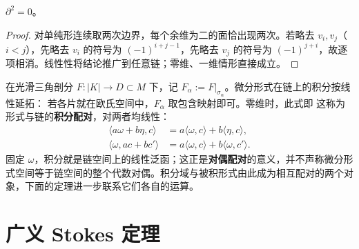 \begin{theorem}\label{thm:chain-boundary-square}
    $\partial^2=0$。
\end{theorem}
\begin{proof}
    对单纯形连续取两次边界，每个余维为二的面恰出现两次。若略去 $v_i,v_j$（$i<j$），先略去 $v_i$ 的符号为 $(-1)^{i+j-1}$，先略去 $v_j$ 的符号为 $(-1)^{j+i}$，故逐项相消。线性性将结论推广到任意链；零维、一维情形直接成立。
\end{proof}

在光滑三角剖分 $F:|K|\to D\subset M$ 下，记 $F_\alpha:=F|_{\sigma_\alpha}$。微分形式在链上的积分按线性延拓：
若各片就在欧氏空间中，$F_\alpha$ 取包含映射即可。零维时，此式即
这称为形式与链的\textbf{积分配对}，对两者均线性：
\begin{align*}
    \langle a\omega+b\eta,c\rangle&=a\langle\omega,c\rangle+b\langle\eta,c\rangle,\\
    \langle\omega,ac+bc'\rangle&=a\langle\omega,c\rangle+b\langle\omega,c'\rangle.
\end{align*}
固定 $\omega$，积分就是链空间上的线性泛函；这正是\textbf{对偶配对}的意义，并不声称微分形式空间等于链空间的整个代数对偶。积分域与被积形式由此成为相互配对的两个对象，下面的定理进一步联系它们各自的运算。

\section{广义 Stokes 定理}\label{sec:generalized-stokes}

